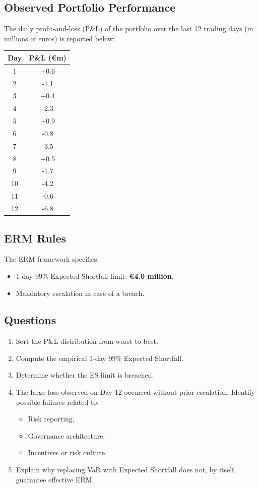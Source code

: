 \documentclass[11pt]{article}
\begin{document}
\subsection*{Observed Portfolio Performance}

The daily profit-and-loss (P\&L) of the portfolio over the last 12 trading days
(in millions of euros) is reported below:

\begin{center}
\begin{tabular}{cc}
\toprule
Day & P\&L (€m) \\
\midrule
1  & +0.6 \\
2  & -1.1 \\
3  & +0.4 \\
4  & -2.3 \\
5  & +0.9 \\
6  & -0.8 \\
7  & -3.5 \\
8  & +0.5 \\
9  & -1.7 \\
10 & -4.2 \\
11 & -0.6 \\
12 & -6.8 \\
\bottomrule
\end{tabular}
\end{center}

\subsection*{ERM Rules}

The ERM framework specifies:
\begin{itemize}
    \item 1-day 99\% Expected Shortfall limit: \textbf{€4.0 million}.
    \item Mandatory escalation in case of a breach.
\end{itemize}

\subsection*{Questions}

\begin{enumerate}
    \item Sort the P\&L distribution from worst to best.
    \item Compute the empirical 1-day 99\% Expected Shortfall.
    \item Determine whether the ES limit is breached.
    \item The large loss observed on Day 12 occurred without prior escalation.
    Identify possible failures related to:
    \begin{itemize}
        \item Risk reporting,
        \item Governance architecture,
        \item Incentives or risk culture.
    \end{itemize}
    \item Explain why replacing VaR with Expected Shortfall does not, by itself,
    guarantee effective ERM.
\end{enumerate}
\end{document}
